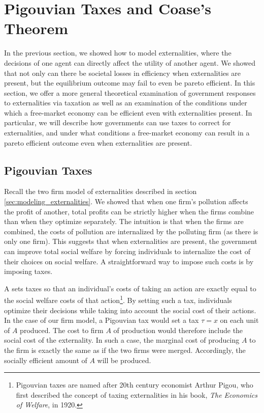 \section{Pigouvian Taxes and Coase's Theorem}
In the previous section, we showed how to model externalities, where the decisions of one agent can directly affect the utility of another agent. We showed that not only can there be societal losses in efficiency when externalities are present, but the equilibrium outcome may fail to even be pareto efficient. In this section, we offer a more general theoretical examination of government responses to externalities via taxation as well as an examination of the conditions under which a free-market economy can be efficient even with externalities present. In particular, we will describe how governments can use taxes to correct for externalities, and under what conditions a free-market economy can result in a pareto efficient outcome even when externalities are present. 

\subsection*{Pigouvian Taxes}
Recall the two firm model of externalities described in section \ref{sec:modeling_externalities}. We showed that when one firm's pollution affects the profit of another, total profits can be strictly higher when the firms combine than when they optimize separately. The intuition is that when the firms are combined, the costs of pollution are internalized by the polluting firm (as there is only one firm). This suggests that when externalities are present, the government can improve total social welfare by forcing individuals to internalize the cost of their choices on social welfare. A straightforward way to impose such costs is by imposing taxes.

A  sets taxes so that an individual's costs of taking an action are exactly equal to the social welfare costs of that action\footnote{Pigouvian taxes are named after 20th century economist Arthur Pigou, who first described the concept of taxing externalities in his book, \emph{The Economics of Welfare}, in 1920.}. By setting such a tax, individuals optimize their decisions while taking into account the social cost of their actions. In the case of our firm model, a Pigouvian tax would set a tax $\tau = x$ on each unit of $A$ produced. The cost to firm $A$ of production would therefore include the social cost of the externality. In such a case, the marginal cost of producing $A$ to the firm is exactly the same as if the two firms were merged. Accordingly, the socially efficient amount of $A$ will be produced.  

